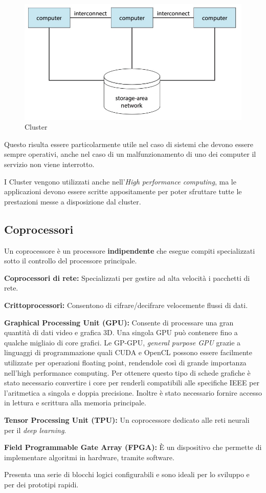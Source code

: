 \begin{figure}[H]
    \centering
    \includegraphics[width=0.5\linewidth]{assets/cluster.png}
    \caption{Cluster}
\end{figure}

\begin{note}
    Questo risulta essere particolarmente utile nel caso di sistemi che devono essere sempre operativi, anche nel caso di un malfunzionamento di uno dei computer il servizio non viene interrotto.

    \spacer
    I Cluster vengono utilizzati anche nell'\textit{High performance computing}, ma le applicazioni devono essere scritte appositamente per poter sfruttare tutte le prestazioni messe a disposizione dal cluster.
\end{note}

\subsection{Coprocessori}
Un coprocessore è un processore \textbf{indipendente} che esegue compiti specializzati sotto il controllo del processore principale.

\spacer
\begin{sitemize}
    \item \textbf{Coprocessori di rete:} Specializzati per gestire ad alta velocità i pacchetti di rete.
    \item \textbf{Crittoprocessori:} Consentono di cifrare/decifrare velocemente flussi di dati.
    \item \textbf{Graphical Processing Unit (GPU):} Consente di processare una gran quantità di dati video e grafica 3D. Una singola GPU può contenere fino a qualche migliaio di core grafici.
    \spacer
    Le GP-GPU, \textit{general purpose GPU} grazie a linguaggi di programmazione quali CUDA e OpenCL possono essere facilmente utilizzate per operazioni floating point, rendendole così di grande importanza nell'high performance computing.
    \spacer
    Per ottenere questo tipo di schede grafiche è stato necessario convertire i core per renderli compatibili alle specifiche IEEE per l'aritmetica a singola e doppia precisione. Inoltre è stato necessario fornire accesso in lettura e scrittura alla memoria principale.
    \item \textbf{Tensor Processing Unit (TPU):} Un coprocessore dedicato alle reti neurali per il \textit{deep learning}.
    \item \textbf{Field Programmable Gate Array (FPGA):} È un dispositivo che permette di implementare algoritmi in hardware, tramite software.

    Presenta una serie di blocchi logici configurabili e sono ideali per lo sviluppo e per dei prototipi rapidi.
\end{sitemize}
